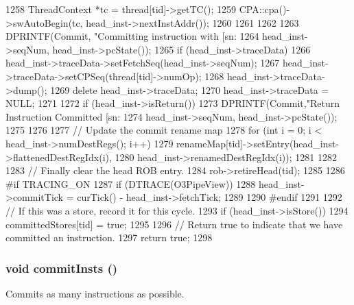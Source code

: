\begin{DoxyCode}
{{{{1258                 ThreadContext *tc = thread[tid]->getTC();
1259                 CPA::cpa()->swAutoBegin(tc, head_inst->nextInstAddr());
1260             }
1261         }
1262     }
1263     DPRINTF(Commit, "Committing instruction with [sn:%
1264             head_inst->seqNum, head_inst->pcState());
1265     if (head_inst->traceData) {
1266         head_inst->traceData->setFetchSeq(head_inst->seqNum);
1267         head_inst->traceData->setCPSeq(thread[tid]->numOp);
1268         head_inst->traceData->dump();
1269         delete head_inst->traceData;
1270         head_inst->traceData = NULL;
1271     }
1272     if (head_inst->isReturn()) {
1273         DPRINTF(Commit,"Return Instruction Committed [sn:%
1274                         head_inst->seqNum, head_inst->pcState());
1275     }
1276 
1277     // Update the commit rename map
1278     for (int i = 0; i < head_inst->numDestRegs(); i++) {
1279         renameMap[tid]->setEntry(head_inst->flattenedDestRegIdx(i),
1280                                  head_inst->renamedDestRegIdx(i));
1281     }
1282 
1283     // Finally clear the head ROB entry.
1284     rob->retireHead(tid);
1285 
1286 #if TRACING_ON
1287     if (DTRACE(O3PipeView)) {
1288         head_inst->commitTick = curTick() - head_inst->fetchTick;
1289     }
1290 #endif
1291 
1292     // If this was a store, record it for this cycle.
1293     if (head_inst->isStore())
1294         committedStores[tid] = true;
1295 
1296     // Return true to indicate that we have committed an instruction.
1297     return true;
1298 }
\end{DoxyCode}
\hypertarget{classDefaultCommit_ac8b85fbfdf330d000c094a9d1886d264}{
\subsubsection[{commitInsts}]{\setlength{\rightskip}{0pt plus 5cm}void commitInsts ()}}
\label{classDefaultCommit_ac8b85fbfdf330d000c094a9d1886d264}
Commits as many instructions as possible. 


